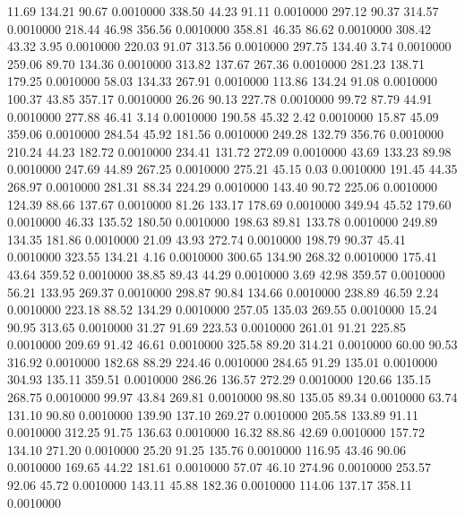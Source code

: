   11.69  134.21   90.67   0.0010000
 338.50   44.23   91.11   0.0010000
 297.12   90.37  314.57   0.0010000
 218.44   46.98  356.56   0.0010000
 358.81   46.35   86.62   0.0010000
 308.42   43.32    3.95   0.0010000
 220.03   91.07  313.56   0.0010000
 297.75  134.40    3.74   0.0010000
 259.06   89.70  134.36   0.0010000
 313.82  137.67  267.36   0.0010000
 281.23  138.71  179.25   0.0010000
  58.03  134.33  267.91   0.0010000
 113.86  134.24   91.08   0.0010000
 100.37   43.85  357.17   0.0010000
  26.26   90.13  227.78   0.0010000
  99.72   87.79   44.91   0.0010000
 277.88   46.41    3.14   0.0010000
 190.58   45.32    2.42   0.0010000
  15.87   45.09  359.06   0.0010000
 284.54   45.92  181.56   0.0010000
 249.28  132.79  356.76   0.0010000
 210.24   44.23  182.72   0.0010000
 234.41  131.72  272.09   0.0010000
  43.69  133.23   89.98   0.0010000
 247.69   44.89  267.25   0.0010000
 275.21   45.15    0.03   0.0010000
 191.45   44.35  268.97   0.0010000
 281.31   88.34  224.29   0.0010000
 143.40   90.72  225.06   0.0010000
 124.39   88.66  137.67   0.0010000
  81.26  133.17  178.69   0.0010000
 349.94   45.52  179.60   0.0010000
  46.33  135.52  180.50   0.0010000
 198.63   89.81  133.78   0.0010000
 249.89  134.35  181.86   0.0010000
  21.09   43.93  272.74   0.0010000
 198.79   90.37   45.41   0.0010000
 323.55  134.21    4.16   0.0010000
 300.65  134.90  268.32   0.0010000
 175.41   43.64  359.52   0.0010000
  38.85   89.43   44.29   0.0010000
   3.69   42.98  359.57   0.0010000
  56.21  133.95  269.37   0.0010000
 298.87   90.84  134.66   0.0010000
 238.89   46.59    2.24   0.0010000
 223.18   88.52  134.29   0.0010000
 257.05  135.03  269.55   0.0010000
  15.24   90.95  313.65   0.0010000
  31.27   91.69  223.53   0.0010000
 261.01   91.21  225.85   0.0010000
 209.69   91.42   46.61   0.0010000
 325.58   89.20  314.21   0.0010000
  60.00   90.53  316.92   0.0010000
 182.68   88.29  224.46   0.0010000
 284.65   91.29  135.01   0.0010000
 304.93  135.11  359.51   0.0010000
 286.26  136.57  272.29   0.0010000
 120.66  135.15  268.75   0.0010000
  99.97   43.84  269.81   0.0010000
  98.80  135.05   89.34   0.0010000
  63.74  131.10   90.80   0.0010000
 139.90  137.10  269.27   0.0010000
 205.58  133.89   91.11   0.0010000
 312.25   91.75  136.63   0.0010000
  16.32   88.86   42.69   0.0010000
 157.72  134.10  271.20   0.0010000
  25.20   91.25  135.76   0.0010000
 116.95   43.46   90.06   0.0010000
 169.65   44.22  181.61   0.0010000
  57.07   46.10  274.96   0.0010000
 253.57   92.06   45.72   0.0010000
 143.11   45.88  182.36   0.0010000
 114.06  137.17  358.11   0.0010000
